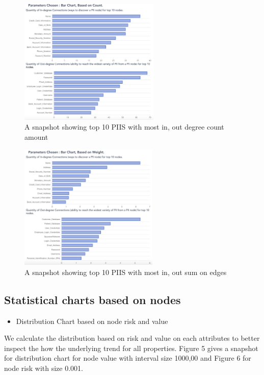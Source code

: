 \documentclass[letterpaper, 10 pt, conference]{ieeeconf}  %
\begin{document}
\begin{figure}[h!]
  \includegraphics[width=\linewidth, height=6cm]{pic3.png}
  \caption{A snapshot showing top 10 PIIS with most in, out degree count amount}
  \label{fig:pic2}
\end{figure}

\begin{figure}[h!]
  \includegraphics[width=\linewidth, height=6cm]{pic4.png}
  \caption{A snapshot showing top 10 PIIS with most in, out sum on edges}
  \label{fig:pic2}
\end{figure}

\subsection{Statistical charts based on nodes}
\begin{itemize}
\item Distribution Chart based on node risk and value
\end{itemize}

We calculate the distribution based on risk and value on each attributes to better inspect the how the underlying trend for all properties. Figure 5 gives a snapshot for distribution chart for node value with interval size 1000,00 and  Figure 6 for node risk with size 0.001.
\end{document}
